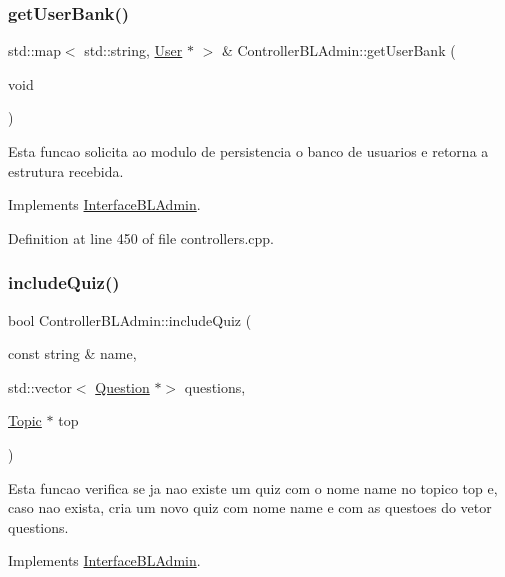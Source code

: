 \subsubsection{\texorpdfstring{get\+User\+Bank()}{getUserBank()}}
{\footnotesize\ttfamily std\+::map$<$ std\+::string, \hyperlink{class_user}{User} $\ast$ $>$ \& Controller\+B\+L\+Admin\+::get\+User\+Bank (\begin{DoxyParamCaption}\item[{void}]{ }\end{DoxyParamCaption})\hspace{0.3cm}{\ttfamily [virtual]}}

Esta funcao solicita ao modulo de persistencia o banco de usuarios e retorna a estrutura recebida. 

Implements \hyperlink{class_interface_b_l_admin_a785c49557dc1dd6a955ee12db1bb6925}{Interface\+B\+L\+Admin}.



Definition at line 450 of file controllers.\+cpp.

\mbox{\label{class_controller_b_l_admin_a995da6bb9402ddb388794ff6410aebe5}} 
\subsubsection{\texorpdfstring{include\+Quiz()}{includeQuiz()}}
{\footnotesize\ttfamily bool Controller\+B\+L\+Admin\+::include\+Quiz (\begin{DoxyParamCaption}\item[{const string \&}]{name,  }\item[{std\+::vector$<$ \hyperlink{class_question}{Question} $\ast$$>$}]{questions,  }\item[{\hyperlink{class_topic}{Topic} $\ast$}]{top }\end{DoxyParamCaption})\hspace{0.3cm}{\ttfamily [virtual]}}

Esta funcao verifica se ja nao existe um quiz com o nome \textquotesingle{}name\textquotesingle{} no topico top e, caso nao exista, cria um novo quiz com nome \textquotesingle{}name\textquotesingle{} e com as questoes do vetor questions. 

Implements \hyperlink{class_interface_b_l_admin_aca0cf080ee23134183cf70dd094edfe2}{Interface\+B\+L\+Admin}.



